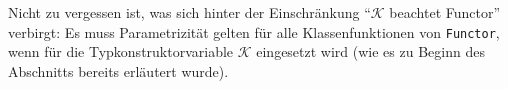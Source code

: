 Nicht zu vergessen ist, was sich hinter der Einschränkung ``$\mathcal{K}$ beachtet Functor'' verbirgt: Es muss Parametrizität gelten
für alle Klassenfunktionen von \texttt{Functor}, wenn für die Typkonstruktorvariable $\mathcal{K}$ eingesetzt wird (wie es zu Beginn
des Abschnitts bereits erläutert wurde).
%
%
%
%
%
%
%

